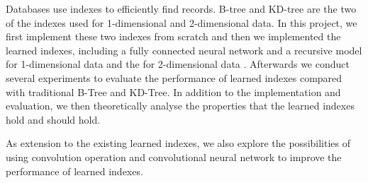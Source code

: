 Databases use indexes to efficiently find records. B-tree and KD-tree are the two of the indexes used for 1-dimensional and 2-dimensional data. In this project, we first implement these two indexes from scratch and then we implemented the learned indexes, including a fully connected neural network and a recursive model for 1-dimensional data \cite{kraska2018case} and the for 2-dimensional data \cite{li2020lisa}. Afterwards we conduct several experiments to evaluate the performance of learned indexes compared with traditional B-Tree and KD-Tree. In addition to the implementation and evaluation, we then theoretically analyse the properties that the learned indexes hold and should hold.

As extension to the existing learned indexes, we also explore the possibilities of using convolution operation and convolutional neural network to improve the performance of learned indexes.